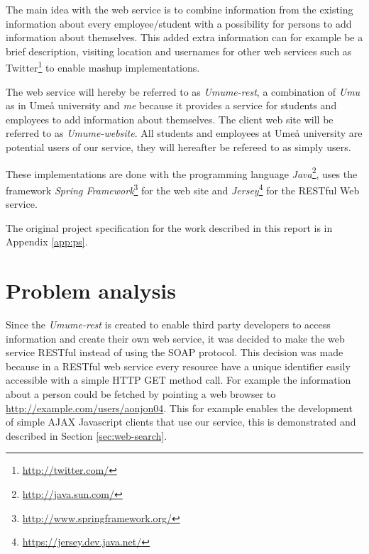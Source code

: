 \documentclass[titlepage, twocolumn, a4paper, 10pt]{article}
\begin{document}
The main idea with the web service is to combine information from the
existing information about every employee/student with a possibility
for persons to add information about themselves. This added extra
information can for example be a brief description, visiting location
and usernames for other web services such as
Twitter\footnote{\url{http://twitter.com/}} to enable mashup
implementations.

The web service will hereby be referred to as \textit{Umume-rest}, a
combination of \textit{Umu} as in Umeå university and \textit{me}
because it provides a service for students and employees to add
information about themselves. The client web site will be referred to
as \textit{Umume-website}. All students and employees at Umeå
university are potential users of our service, they will hereafter be
refereed to as simply users.

These implementations are done with the programming language
\textit{Java}\footnote{\url{http://java.sun.com/}}, uses the framework
\textit{Spring
  Framework}\footnote{\url{http://www.springframework.org/}} for the
web site and
\textit{Jersey}\footnote{\url{https://jersey.dev.java.net/}} for the
RESTful Web service.

The original project specification for the work described in this
report is in Appendix \ref{app:ps}.

\section{Problem analysis}\label{sec:problem-analysis}
Since the \textit{Umume-rest} is created to enable third party
developers to access information and create their own web service, it
was decided to make the web service RESTful instead of using the SOAP
protocol. This decision was made because in a RESTful web service
every resource have a unique identifier easily accessible with a
simple HTTP GET method call. For example the information about a
person could be fetched by pointing a web browser to
\url{http://example.com/users/aonjon04}. This for example enables the
development of simple AJAX Javascript clients that use our service,
this is demonstrated and described in Section \ref{sec:web-search}.
\end{document}
